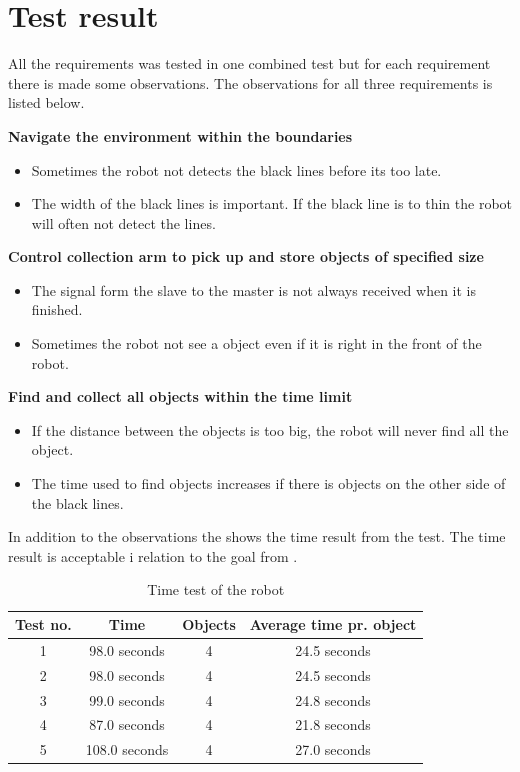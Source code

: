 \section{Test result}

All the requirements was tested in one combined test but for each requirement there is made some observations. The observations for all three requirements is listed below.

\textbf{Navigate the environment within the boundaries}
\begin{itemize}
\item Sometimes the robot not detects the black lines before its too late.
\item The width of the black lines is important. If the black line is to thin the robot will often not detect the lines.
\end{itemize}

\textbf{Control collection arm to pick up and store objects of specified size}
\begin{itemize}
\item The signal form the slave to the master is not always received when it is finished.
\item Sometimes the robot not see a object even if it is right in the front of the robot.
\end{itemize}
\textbf{Find and collect all objects within the time limit}
\begin{itemize}
\item If the distance between the objects is too big, the robot will never find all the object. 
\item The time used to find objects increases if there is objects on the other side of the black lines.  
\end{itemize}

In addition to the observations the  shows the time result from the test. The time result is acceptable i relation to the goal from .

\begin{table}[H]
	\centering
   \begin{tabular}{|c|c|c|c|}
   \hline  
   Test no. & Time & Objects & Average time pr. object \\ \hline
      1    & 98.0 seconds    & 4 & 24.5 seconds   \\ \hline
      2    & 98.0 seconds    & 4 & 24.5 seconds  \\ \hline
      3    & 99.0 seconds    & 4 & 24.8 seconds  \\ \hline
      4    & 87.0 seconds    & 4 & 21.8 seconds  \\ \hline
      5    & 108.0 seconds   & 4 & 27.0 seconds  \\ \hline
   \end{tabular}
   \caption{\label{table:FinalTimeTestRobot} Time test of the robot}
\end{table}







